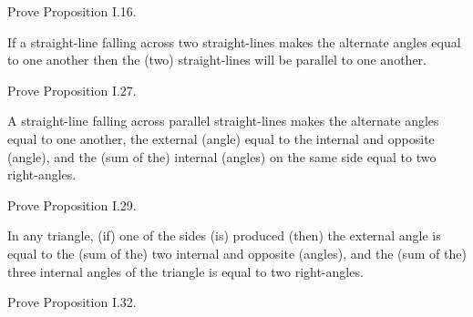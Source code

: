 \documentclass{ximera}
\begin{document}
\begin{question}
Prove Proposition I.16.
\end{question}

\begin{proposition}[I.27]
If a straight-line falling across two straight-lines makes the
alternate angles equal to one another then the (two) straight-lines
will be parallel to one another.
\end{proposition}


\begin{question}
Prove Proposition I.27.
\end{question}


\begin{proposition}[I.29]
A straight-line falling across parallel straight-lines makes the
alternate angles equal to one another, the external (angle) equal to
the internal and opposite (angle), and the (sum of the) internal
(angles) on the same side equal to two right-angles.
\end{proposition}


\begin{question}
Prove Proposition I.29.
\end{question}


\begin{proposition}[I.32]
In any triangle, (if) one of the sides (is) produced (then) the
external angle is equal to the (sum of the) two internal and opposite
(angles), and the (sum of the) three internal angles of the triangle
is equal to two right-angles.
\end{proposition}


\begin{question}
Prove Proposition I.32.
\end{question}
\end{document}
